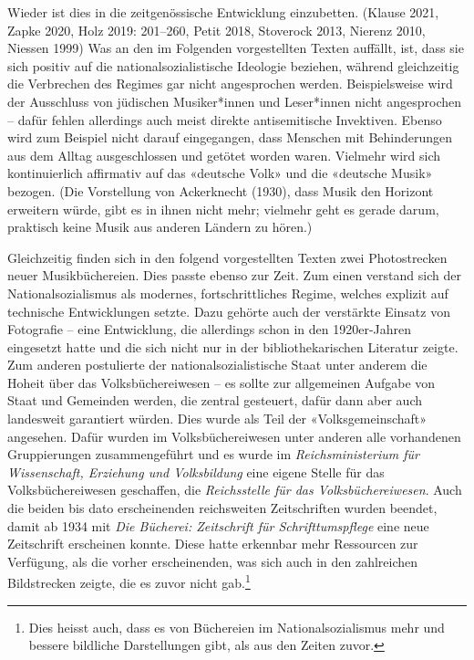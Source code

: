 \documentclass[a4paper,
fontsize=11pt,
oneside,
numbers=noperiodatend,
parskip=half-,
bibliography=totoc,
final
]{scrartcl}
\begin{document}
Wieder ist dies in die zeitgenössische Entwicklung einzubetten. (Klause
2021, Zapke 2020, Holz 2019: 201--260, Petit 2018, Stoverock 2013,
Nierenz 2010, Niessen 1999) Was an den im Folgenden vorgestellten Texten
auffällt, ist, dass sie sich positiv auf die nationalsozialistische
Ideologie beziehen, während gleichzeitig die Verbrechen des Regimes gar
nicht angesprochen werden. Beispielsweise wird der Ausschluss von
jüdischen Musiker*innen und Leser*innen nicht angesprochen -- dafür
fehlen allerdings auch meist direkte antisemitische Invektiven. Ebenso
wird zum Beispiel nicht darauf eingegangen, dass Menschen mit
Behinderungen aus dem Alltag ausgeschlossen und getötet worden waren.
Vielmehr wird sich kontinuierlich affirmativ auf das «deutsche Volk» und
die «deutsche Musik» bezogen. (Die Vorstellung von Ackerknecht (1930),
dass Musik den Horizont erweitern würde, gibt es in ihnen nicht mehr;
vielmehr geht es gerade darum, praktisch keine Musik aus anderen Ländern
zu hören.)

Gleichzeitig finden sich in den folgend vorgestellten Texten zwei
Photostrecken neuer Musikbüchereien. Dies passte ebenso zur Zeit. Zum
einen verstand sich der Nationalsozialismus als modernes,
fortschrittliches Regime, welches explizit auf technische Entwicklungen
setzte. Dazu gehörte auch der verstärkte Einsatz von Fotografie -- eine
Entwicklung, die allerdings schon in den 1920er-Jahren eingesetzt hatte
und die sich nicht nur in der bibliothekarischen Literatur zeigte. Zum
anderen postulierte der nationalsozialistische Staat unter anderem die
Hoheit über das Volksbüchereiwesen -- es sollte zur allgemeinen Aufgabe
von Staat und Gemeinden werden, die zentral gesteuert, dafür dann aber
auch landesweit garantiert würden. Dies wurde als Teil der
«Volksgemeinschaft» angesehen. Dafür wurden im Volksbüchereiwesen unter
anderen alle vorhandenen Gruppierungen zusammengeführt und es wurde im
\emph{Reichsministerium für Wissenschaft, Erziehung und Volksbildung}
eine eigene Stelle für das Volksbüchereiwesen geschaffen, die
\emph{Reichsstelle für das Volksbüchereiwesen}. Auch die beiden bis dato
erscheinenden reichsweiten Zeitschriften wurden beendet, damit ab 1934
mit \emph{Die Bücherei: Zeitschrift für Schrifttumspflege} eine neue
Zeitschrift erscheinen konnte. Diese hatte erkennbar mehr Ressourcen zur
Verfügung, als die vorher erscheinenden, was sich auch in den
zahlreichen Bildstrecken zeigte, die es zuvor nicht gab.\footnote{Dies
  heisst auch, dass es von Büchereien im Nationalsozialismus mehr und
  bessere bildliche Darstellungen gibt, als aus den Zeiten zuvor.}
\end{document}
